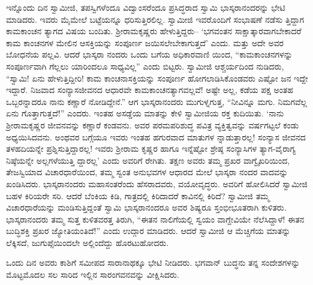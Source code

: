 ಇನ್ನೊಂದು ದಿನ ಸ್ವಾಮೀಜಿ, ತಪಸ್ವಿಗಳೆಂದೂ ವಿದ್ವಾಂಸರೆಂದೂ ಪ್ರಸಿದ್ಧರಾದ ಸ್ವಾಮಿ ಭಾಸ್ಕರಾನಂದರನ್ನು ಭೇಟಿ ಮಾಡಿದರು. ಇವರು ಮೈಮೇಲೆ ಬಟ್ಟೆಯನ್ನೂ ಧರಿಸುತ್ತಿರಲಿಲ್ಲ. ಸ್ವಾಮೀಜಿ ಇವರೊಂದಿಗೆ ಸಂಭಾಷಣೆ ನಡೆಸು ತ್ತಿದ್ದಾಗ ಕಾಮಕಾಂಚನ ತ್ಯಾಗದ ವಿಷಯ ಬಂದಿತು. ಶ್ರೀರಾಮಕೃಷ್ಣರು ಹೇಳುತ್ತಿದ್ದರು– ‘ಭಗವಂತನ ಸಾಕ್ಷಾತ್ಕಾರವಾಗಬೇಕಾದರೆ ಕಾಮ ಕಾಂಚನಗಳ ಮೇಲಿನ ಆಸಕ್ತಿಯನ್ನು ಸಂಪೂರ್ಣ ಜಯಿಸಲೇಬೇಕಾಗುತ್ತದೆ’ ಎಂದು. ಮತ್ತು ಅದೇ ಅವರ ಬೋಧನೆಯ ಪಲ್ಲವಿ. ಆದರೆ ಭಾಸ್ಕರಾ ನಂದರು ಒಂದು ಬಗೆಯ ಅಧಿಕಾರವಾಣಿ ಯಿಂದ, “ಕಾಮಕಾಂಚನಗಳನ್ನು ಸಂಪೂರ್ಣವಾಗಿ ಗೆಲ್ಲಲು ಯಾರಿಂದಲೂ ಸಾಧ್ಯವಿಲ್ಲ” ಎಂದು ಬಿಟ್ಟರು. ಸ್ವಾಮೀಜಿ ಆಶ್ಚರ್ಯದಿಂದ ನುಡಿದರು, “ಸ್ವಾಮಿ! ಏನು ಹೇಳುತ್ತಿದ್ದೀರಿ! ಕಾಮ ಕಾಂಚನಾಸಕ್ತಿಯನ್ನು ಸಂಪೂರ್ಣ ಹೋಗಲಾಡಿಸಿಕೊಂಡವರು ಎಷ್ಟೋ ಜನ ಇದ್ದೇ ಇದ್ದಾರೆ. ನಿಜವಾದ ಸಂನ್ಯಾಸಜೀವನದ ಆಧಾರವೇ ಕಾಮಕಾಂಚನತ್ಯಾಗವಲ್ಲವೆ! ಅಷ್ಟೇ ಅಲ್ಲ, ಕಡೆಯ ಪಕ್ಷ ಅಂತಹ ಒಬ್ಬರನ್ನಾದರೂ ನಾನು ಕಣ್ಣಾರೆ ನೋಡಿದ್ದೇನೆ.” ಆಗ ಭಾಸ್ಕರಾನಂದರು ಮುಗುಳ್ನಗುತ್ತ, “ನೀವಿನ್ನೂ ಮಗು. ನಿಮಗವೆಲ್ಲ ಏನು ಗೊತ್ತಾಗುತ್ತದೆ!” ಎಂದರು. ಇಂತಹ ಅಸಡ್ಡೆಯ ಮಾತನ್ನು ಕೇಳಿ ಸ್ವಾಮೀಜಿಯ ರಕ್ತ ಕುದಿಯಿತು. ‘ನಾನು ಶ್ರೀರಾಮಕೃಷ್ಣರ ಜೀವನವನ್ನು ಕಣ್ಣಾರೆ ಕಂಡವನು. ಅವರ ಪರಮಪರಿಶುದ್ಧ ಪವಿತ್ರ ವ್ಯಕ್ತಿತ್ವವನ್ನು ವರ್ಷಗಟ್ಟಲೆ ಕಂಡು ಅಧ್ಯಯಿಸಿದವನು. ಅಂಥವರ ಬಗ್ಗೆಯೂ ಇವರು ಇಂತಹ ಹಗುರವಾದ ಮಾತುಗಳ ನ್ನಾಡುತ್ತಾರಲ್ಲ! ಸಂನ್ಯಾಸ ಜೀವನದ ತಳಹದಿಯನ್ನೇ ಪ್ರಶ್ನಿಸುತ್ತಿದ್ದಾರಲ್ಲ! ಇವರು ಶ್ರೀರಾಮ ಕೃಷ್ಣರ ಹಾಗೂ ಇನ್ನೆಷ್ಟೋ ಶ್ರೇಷ್ಠ ಸಂನ್ಯಾಸಿಗಳ ತ್ಯಾಗ-ವೈರಾಗ್ಯ ನಿಷ್ಠೆಯನ್ನೇ ಅಲ್ಲಗಳೆಯುತ್ತಿ ದ್ದಾರಲ್ಲ’ ಎಂದು ಅವರಿಗೆ ರೇಗಿತು. ತಕ್ಷಣ ಅವರು ತಮ್ಮ ಪ್ರಖರ ವಾಗ್ವೈಖರಿಯಿಂದ, ತೇಜಸ್ವಿಯಾದ ವಿಚಾರಧಾರೆಯಿಂದ, ತಮ್ಮ ಸ್ವಂತ ಅನುಭವಗಳ ಆಧಾರದ ಮೇಲೆ ಭಾಸ್ಕರಾ ನಂದರ ವಾದವನ್ನು ಖಂಡಿಸಿದರು. ಭಾಸ್ಕರಾನಂದರು ಮಹಾಸಂತರೆಂದು ಹೆಸರಾದವರು, ವಯೋವೃದ್ಧರು. ಅವರಿಗೆ ಹೋಲಿಸಿದರೆ ಸ್ವಾಮೀಜಿ ಬಹಳ ಕಿರಿಯರೇ ಸರಿ. ಆದರೆ ಬೆಂಕಿಯ ಕಿಡಿ, ಗಾತ್ರದಲ್ಲಿ ಕಿರಿದಾದರೆ ಕಾವಿನಲ್ಲಿ ಕಿರಿದೆ? ಸ್ವಾಮೀಜಿ ತಮ್ಮ ವಿಚಾರಧಾರೆಯನ್ನು ಮಂಡಿಸುತ್ತಿದ್ದಂತೆ ಸ್ವಾಮಿ ಭಾಸ್ಕರಾನಂದರೂ ಅವರ ಶಿಷ್ಯರೂ ಸ್ತಂಭೀಭೂತರಾಗಿ ಕುಳಿತರು. ಭಾಸ್ಕರಾನಂದರು ತಮ್ಮ ಸುತ್ತ ಕುಳಿತವರತ್ತ ತಿರುಗಿ, “ಈತನ ನಾಲಿಗೆಯಲ್ಲಿ ಸ್ವಯಂ ವಾಗ್ದೇವಿಯೇ ನೆಲೆಸಿದ್ದಾಳೆ! ಈತನ ಬುದ್ಧಿಶಕ್ತಿ ಪ್ರಖರ ಜ್ಯೋತಿಯಂತಿದೆ!” ಎಂದು ಉದ್ಗಾರ ಮಾಡಿದರು. ಆದರೆ ಸ್ವಾಮೀಜಿ ಆ ಮೆಚ್ಚಿಗೆಯ ಮಾತನ್ನು ಲೆಕ್ಕಿಸದೆ, ಜುಗುಪ್ಸೆಯಿಂದಲೇ ಅಲ್ಲಿಂದೆದ್ದು ಹೊರಟುಹೋದರು. 

ಒಂದು ದಿನ ಅವರು ಕಾಶಿಗೆ ಸಮೀಪದ ಸಾರಾನಾಥಕ್ಕೂ ಭೇಟಿ ನೀಡಿದರು. ಭಗವಾನ್ ಬುದ್ಧನು ತನ್ನ ಸಂದೇಶಗಳನ್ನು ಮೊಟ್ಟಮೊದಲ ಸಲ ಸಾರಿದ ಇಲ್ಲಿನ ಸಾರಂಗವನವನ್ನು ವೀಕ್ಷಿಸಿದರು.

